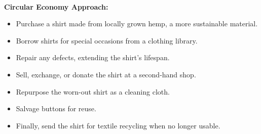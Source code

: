 \documentclass[../summary.tex]{subfiles}
\begin{document}
	\ \\
	\textbf{Circular Economy Approach:}
	\begin{itemize}
		\itemsep0em 
		\item Purchase a shirt made from locally grown hemp, a more sustainable material.
		\item Borrow shirts for special occasions from a clothing library.
		\item Repair any defects, extending the shirt's lifespan.
		\item Sell, exchange, or donate the shirt at a second-hand shop.
		\item Repurpose the worn-out shirt as a cleaning cloth.
		\item Salvage buttons for reuse.
		\item Finally, send the shirt for textile recycling when no longer usable.
	\end{itemize}
	
\end{document}
